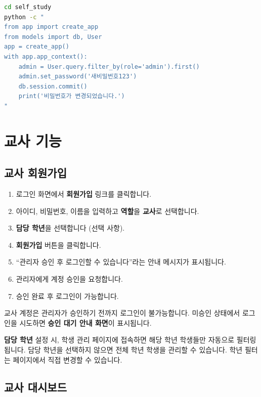 \documentclass[a4paper,12pt]{article}
\newcommand{\menu}[1]{\textcolor{primary}{\textbf{#1}}}
\begin{document}
\begin{lstlisting}[language=bash, caption=비밀번호 직접 재설정]
cd self_study
python -c "
from app import create_app
from models import db, User
app = create_app()
with app.app_context():
    admin = User.query.filter_by(role='admin').first()
    admin.set_password('새비밀번호123')
    db.session.commit()
    print('비밀번호가 변경되었습니다.')
"
\end{lstlisting}

\section{교사 기능}

\subsection{교사 회원가입}

\begin{enumerate}[leftmargin=1.5em]
    \item 로그인 화면에서 \menu{회원가입} 링크를 클릭합니다.
    \item 아이디, 비밀번호, 이름을 입력하고 \textbf{역할}을 \menu{교사}로 선택합니다.
    \item \textbf{담당 학년}을 선택합니다 (선택 사항).
    \item \menu{회원가입} 버튼을 클릭합니다.
    \item ``관리자 승인 후 로그인할 수 있습니다''라는 안내 메시지가 표시됩니다.
    \item 관리자에게 계정 승인을 요청합니다.
    \item 승인 완료 후 로그인이 가능합니다.
\end{enumerate}

\begin{notebox}
  교사 계정은 관리자가 승인하기 전까지 로그인이 불가능합니다.
  미승인 상태에서 로그인을 시도하면 \textbf{승인 대기 안내 화면}이 표시됩니다.
\end{notebox}

\begin{tipbox}
  \textbf{담당 학년} 설정 시, 학생 관리 페이지에 접속하면 해당 학년 학생들만 자동으로 필터링됩니다.
  담당 학년을 선택하지 않으면 전체 학년 학생을 관리할 수 있습니다.
  학년 필터는 페이지에서 직접 변경할 수 있습니다.
\end{tipbox}

\subsection{교사 대시보드}
\end{document}
